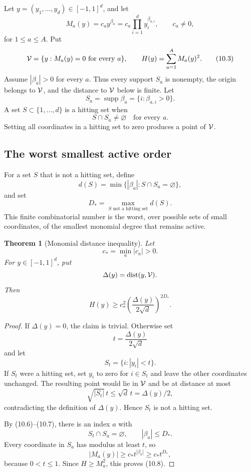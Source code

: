 \documentclass[11pt]{article}
\newtheorem{theorem}{Theorem}[section]
\theoremstyle{remark}
\begin{document}
Let \(y=(y_1,\ldots,y_d)\in[-1,1]^d\), and let
\[
 M_a(y)=c_a y^{\beta_a}
 =
 c_a\prod_{i=1}^dy_i^{\beta_{a,i}},
 \qquad c_a\ne0,                                   \tag{10.2}
\]
for \(1\leq a\leq A\).  Put
\[
 {\cal V}=\{y:M_a(y)=0\text{ for every }a\},\qquad
 H(y)=\sum_{a=1}^AM_a(y)^2.                        \tag{10.3}
\]
Assume \(|\beta_a|>0\) for every \(a\).  Thus every support
\(S_a\) is nonempty, the origin belongs to \({\cal V}\), and the
distance to \({\cal V}\) below is finite.
Let
\[
 S_a=\operatorname{supp}\beta_a
 =\{i:\beta_{a,i}>0\}.                              \tag{10.4}
\]
A set \(S\subset\{1,\ldots,d\}\) is a hitting set when
\[
 S\cap S_a\ne\varnothing
 \quad\text{for every }a.                           \tag{10.5}
\]
Setting all coordinates in a hitting set to zero produces a point
of \({\cal V}\).

\subsection{The worst smallest active order}

For a set \(S\) that is not a hitting set, define
\[
 d(S)=
 \min\{|\beta_a|:S\cap S_a=\varnothing\},           \tag{10.6}
\]
and set
\[
 D_*=
 \max_{S\text{ not a hitting set}}d(S).             \tag{10.7}
\]
This finite combinatorial number is the worst, over possible sets of
small coordinates, of the smallest monomial degree that remains
active.

\begin{theorem}[Monomial distance inequality]
\label{thm:v17v10-distance}
Let
\[
 c_*=\min_a|c_a|>0.
\]
For \(y\in[-1,1]^d\), put
\[
 \Delta(y)=\operatorname{dist}(y,{\cal V}).
\]
Then
\[
 H(y)
 \geq
 c_*^2
 \left(\frac{\Delta(y)}{2\sqrt d}\right)^{2D_*}.
                                                               \tag{10.8}
\]
\end{theorem}

\begin{proof}
If \(\Delta(y)=0\), the claim is trivial.  Otherwise set
\[
 t=\frac{\Delta(y)}{2\sqrt d}
\]
and let
\[
 S_t=\{i:|y_i|<t\}.                                 \tag{10.9}
\]
If \(S_t\) were a hitting set, set \(y_i\) to zero for
\(i\in S_t\) and leave the other coordinates unchanged.  The
resulting point would lie in \({\cal V}\) and be at distance at most
\[
 \sqrt{|S_t|}\,t\leq\sqrt d\,t=\Delta(y)/2,
\]
contradicting the definition of \(\Delta(y)\).  Hence \(S_t\) is not
a hitting set.

By (10.6)--(10.7), there is an index \(a\) with
\[
 S_t\cap S_a=\varnothing,\qquad |\beta_a|\leq D_*.
\]
Every coordinate in \(S_a\) has modulus at least \(t\), so
\[
 |M_a(y)|
 \geq c_*t^{|\beta_a|}
 \geq c_*t^{D_*},                                  \tag{10.10}
\]
because \(0<t\leq1\).  Since \(H\geq M_a^2\), this proves (10.8).
\end{proof}
\end{document}
